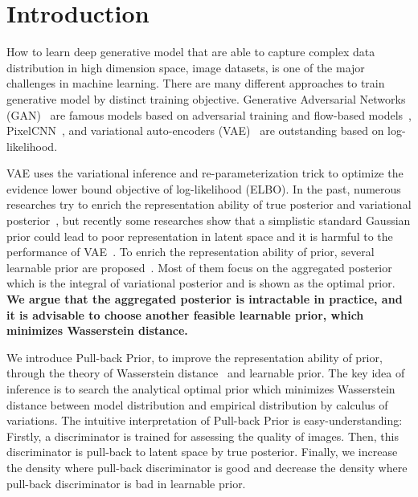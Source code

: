\section{Introduction}

How to learn deep generative model that are able to capture complex data distribution in high dimension space, \EG image datasets, is one of the major challenges in machine learning. There are many different approaches to train generative model by distinct training objective. Generative Adversarial Networks (GAN)~\cite{goodfellow2014generative} are famous models based on adversarial training and flow-based models~\cite{dinh2016density,kingma2018glow}, PixelCNN~\cite{van2016conditional}, and variational auto-encoders (VAE)~\cite{kingma2014auto,rezende_stochastic_2014} are outstanding based on log-likelihood. 

VAE uses the variational inference and re-parameterization trick to optimize the evidence lower bound objective of log-likelihood (ELBO). In the past, numerous researches try to enrich the representation ability of true posterior and variational posterior~\cite{kingma2016improved,tomczak2016improving}, but recently some researches show that a simplistic standard Gaussian prior could lead to poor representation in latent space and it is harmful to the performance of VAE~\cite{tomczak2018vae}. To enrich the representation ability of prior, several learnable prior are proposed~\cite{tomczak2018vae,bauer2019resampled,takahashi2019variational}. Most of them focus on the aggregated posterior which is the integral of variational posterior and is shown as the optimal prior. \textbf{We argue that the aggregated posterior is intractable in practice, and it is advisable to choose another feasible learnable prior, which minimizes Wasserstein distance. } 

We introduce Pull-back Prior, to improve the representation ability of prior, through the theory of Wasserstein distance~\cite{arjovsky2017wasserstein} and learnable prior. The key idea of inference is to search the analytical optimal prior which minimizes Wasserstein distance between model distribution and empirical distribution by calculus of variations. 
The intuitive interpretation of Pull-back Prior is easy-understanding: Firstly, a discriminator is trained for assessing the quality of images. Then, this discriminator is pull-back to latent space by true posterior. Finally, we increase the density where pull-back discriminator is good and decrease the density where pull-back discriminator is bad in learnable prior. 

